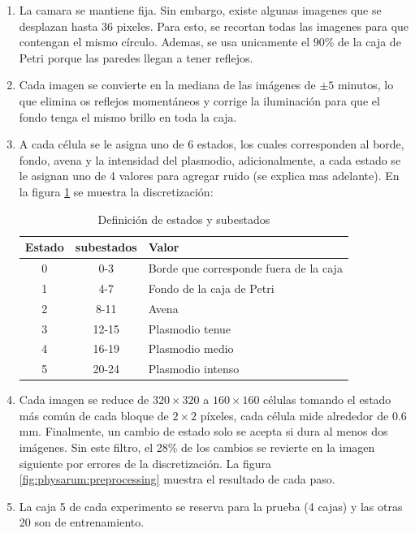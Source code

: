 \begin{enumerate}
	\item La camara se mantiene fija. Sin embargo, existe algunas imagenes que se desplazan hasta 36 pixeles. Para esto, se recortan todas las imagenes para que contengan el mismo círculo. Ademas, se usa unicamente el $90\%$ de la caja de Petri porque las paredes llegan a tener reflejos. 
	
	\item Cada imagen se convierte en la mediana de las imágenes de $\pm 5$ minutos, lo que elimina os reflejos momentáneos y corrige la iluminación para que el fondo tenga el mismo brillo en toda la caja.

	\item A cada célula se le asigna uno de 6 estados, los cuales corresponden al borde, fondo, avena y la intensidad del plasmodio, adicionalmente, a cada estado se le asignan uno de 4 valores para agregar ruido (se explica mas adelante). En la figura \ref{tab:physarum:states} se muestra la discretización:
	
	\begin{table}[H]
		\centering
		\begin{tabular}{c c l}
			\hline
			\textbf{Estado} & \textbf{subestados} & \textbf{Valor} \\ \hline
			0 & 0-3 & Borde que corresponde fuera de la caja \\
			1 & 4-7 & Fondo de la caja de Petri \\
			2 & 8-11 & Avena \\
			3 & 12-15 & Plasmodio tenue \\
			4 & 16-19 & Plasmodio medio \\
			5 & 20-24 & Plasmodio intenso
		\end{tabular}
		\label{tab:physarum:states}
		\caption{Definición de estados y subestados}
	\end{table}

	\item Cada imagen se reduce de $320 \times 320$ a $160 \times 160$ células tomando el estado más común de cada bloque de $2 \times 2$ píxeles, cada célula mide alrededor de 0.6 mm. Finalmente, un cambio de estado solo se acepta si dura al menos dos imágenes. Sin este filtro, el 28\% de los cambios se revierte en la imagen siguiente por errores de la discretización. La figura \ref{fig:physarum:preprocessing} muestra el resultado de cada paso.

	\item La caja 5 de cada experimento se reserva para la prueba (4 cajas) y las otras 20 son de entrenamiento.
\end{enumerate}

